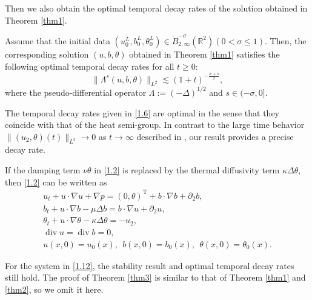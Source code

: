 \documentclass[reqno]{amsart}
\begin{document}
Then we also obtain the optimal temporal decay rates of the solution obtained in Theorem \ref{thm1}.

\begin{theorem}\label{thm2}
Assume that the initial data $(u_0^L,b_0^L,\theta_0^L)\in \dot{B}^{-\sigma}_{2,\infty}(\mathbb{R}^2)(0<\sigma\leqslant 1)$. Then,
the corresponding solution $(u,b,\theta)$ obtained in Theorem \ref{thm1} satisfies the following optimal temporal decay rates for all $t\geqslant 0$:
\begin{equation} \label{1.6}
\|\Lambda^s(u,b,\theta)\|_{L^2}\lesssim(1+t)^{-\frac{\sigma+s}{2}},
\end{equation}
where the pseudo-differential operator 
$\Lambda:=(-\Delta)^{1/2}$ and $s\in(-\sigma,0]$.
\end{theorem}

\begin{remark} \rm
The temporal decay rates given in \eqref{1.6} are optimal in the sense that they 
coincide with that of the heat semi-group. In contrast to the large time behavior 
$\|(u_2,\theta)(t)\|_{L^2}\to 0$  as $t\to\infty$ described in \cite{MR4790886}, 
our result provides a precise decay rate.
 \end{remark}

 If the damping term $\nu\theta$ in \eqref{1.2} is replaced by the thermal diffusivity term
 $\kappa\Delta\theta$, then \eqref{1.2} can be written as
 \begin{equation}\label{1.12}
 \begin{gathered}
 u_t+ u\cdot \nabla u+\nabla p= (0,\theta)^\mathrm{T}+ b\cdot \nabla b+\partial_2b,\\
 b_t+u\cdot\nabla b-\mu\Delta b=b\cdot\nabla u+\partial_2u,\\
 \theta_t+u\cdot \nabla \theta-\kappa\Delta\theta=-u_2,\\
 \operatorname{div} u=\operatorname{div} b=0,\\
 u(x,0)=u_0(x),\ \ b(x,0)=b_0(x),\ \ \theta(x,0)=\theta_0(x).
 \end{gathered}
 \end{equation}

 For the system in \eqref{1.12}, the stability result and optimal temporal decay rates still hold.
 The proof of Theorem \ref{thm3} is similar to that of Theorem \ref{thm1} and \ref{thm2}, so we omit it here.
\end{document}

